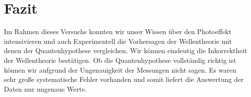 \section{Fazit}
Im Rahmen dieses Versuchs konnten wir unser Wissen über den Photoeffekt intensivieren und auch Experimentell die Vorhersagen der Wellentheorie mit denen der Quantenhypothese vergleichen. Wir können eindeutig die Inkorrektheit der Wellentheorie bestätigen. Ob die Quantenhypothese vollständig richtig ist können wir aufgrund der Ungenauigkeit der Messungen nicht sagen. Es waren sehr große systematische Fehler vorhanden und somit liefert die Auswertung der Daten nur ungenaue Werte. 